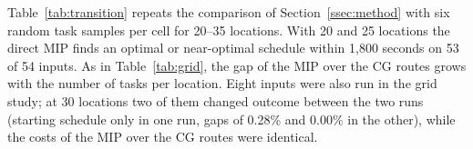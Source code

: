 Table~\ref{tab:transition} repeats the comparison of Section~\ref{ssec:method} with six random task samples per cell for 20--35 locations.
With 20 and 25 locations the direct MIP finds an optimal or near-optimal schedule within 1{,}800 seconds on 53 of 54 inputs.
As in Table~\ref{tab:grid}, the gap of the MIP over the CG routes grows with the number of tasks per location.
Eight inputs were also run in the grid study; at 30 locations two of them changed outcome between the two runs (starting schedule only in one run, gaps of 0.28\% and 0.00\% in the other), while the costs of the MIP over the CG routes were identical.
